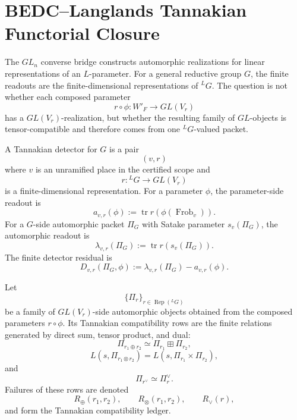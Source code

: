\section{BEDC--Langlands Tannakian Functorial Closure}
\label{sec:unified-reality-bedc-langlands-tannakian-functorial-closure}

The $GL_n$ converse bridge constructs automorphic realizations for
linear representations of an $L$-parameter. For a general reductive
group $G$, the finite readouts are the finite-dimensional
representations of ${}^LG$. The question is not whether each composed
parameter
$$
r\circ\phi:W'_F\to GL(V_r)
$$
has a $GL(V_r)$-realization, but whether the resulting family of
$GL$-objects is tensor-compatible and therefore comes from one
${}^LG$-valued packet.

\begin{definition}
\label{def:unified-reality-tannakian-detector}
A Tannakian detector for $G$ is a pair
$$
(v,r)
$$
where $v$ is an unramified place in the certified scope and
$$
r:{}^LG\to GL(V_r)
$$
is a finite-dimensional representation. For a parameter $\phi$, the
parameter-side readout is
$$
a_{v,r}(\phi)
:=
\operatorname{tr}r(\phi(\operatorname{Frob}_v)).
$$
For a $G$-side automorphic packet $\Pi_G$ with Satake parameter
$s_v(\Pi_G)$, the automorphic readout is
$$
\lambda_{v,r}(\Pi_G)
:=
\operatorname{tr}r(s_v(\Pi_G)).
$$
The finite detector residual is
$$
D_{v,r}(\Pi_G,\phi)
:=
\lambda_{v,r}(\Pi_G)-a_{v,r}(\phi).
$$
\end{definition}

\begin{definition}
\label{def:unified-reality-representation-compatibility-rows}
Let
$$
\{\Pi_r\}_{r\in\operatorname{Rep}({}^LG)}
$$
be a family of $GL(V_r)$-side automorphic objects obtained from the
composed parameters $r\circ\phi$. Its Tannakian compatibility rows are
the finite relations generated by direct sum, tensor product, and dual:
$$
\Pi_{r_1\oplus r_2}
\simeq
\Pi_{r_1}\boxplus\Pi_{r_2},
$$
$$
L(s,\Pi_{r_1\otimes r_2})
=
L(s,\Pi_{r_1}\times\Pi_{r_2}),
$$
and
$$
\Pi_{r^\vee}\simeq\Pi_r^\vee.
$$
Failures of these rows are denoted
$$
R_{\oplus}(r_1,r_2),\qquad
R_{\otimes}(r_1,r_2),\qquad
R_{\vee}(r),
$$
and form the Tannakian compatibility ledger.
\end{definition}

